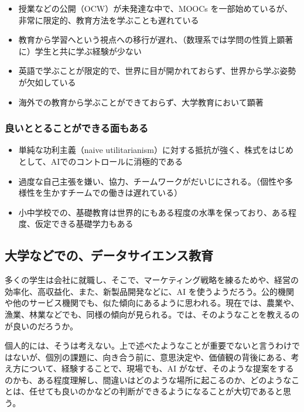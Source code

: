 \documentclass[
]{book}
\providecommand{\tightlist}{%
  \setlength{\itemsep}{0pt}\setlength{\parskip}{0pt}}
\theoremstyle{definition}
\theoremstyle{definition}
\theoremstyle{definition}
\theoremstyle{definition}
\theoremstyle{remark}
\begin{document}
\begin{itemize}
\tightlist
\item
  授業などの公開（OCW）が未発達な中で、MOOCs を一部始めているが、非常に限定的、教育方法を学ぶことも遅れている
\item
  教育から学習へという視点への移行が遅れ、（数理系では学問の性質上顕著に）学生と共に学ぶ経験が少ない
\item
  英語で学ぶことが限定的で、世界に目が開かれておらず、世界から学ぶ姿勢が欠如している
\item
  海外での教育から学ぶことができておらず、大学教育において顕著
\end{itemize}

\hypertarget{ux826fux3044ux3068ux3068ux308bux3053ux3068ux304cux3067ux304dux308bux9762ux3082ux3042ux308b}{%
\subsubsection{良いととることができる面もある}\label{ux826fux3044ux3068ux3068ux308bux3053ux3068ux304cux3067ux304dux308bux9762ux3082ux3042ux308b}}

\begin{itemize}
\tightlist
\item
  単純な功利主義（naive utilitarianism）に対する抵抗が強く、株式をはじめとして、AIでのコントロールに消極的である
\item
  過度な自己主張を嫌い、協力、チームワークがだいじにされる。（個性や多様性を生かすチームでの働きは遅れている）
\item
  小中学校での、基礎教育は世界的にもある程度の水準を保っており、ある程度、仮定できる基礎学力もある
\end{itemize}

\hypertarget{ux5927ux5b66ux306aux3069ux3067ux306eux30c7ux30fcux30bfux30b5ux30a4ux30a8ux30f3ux30b9ux6559ux80b2}{%
\subsection{大学などでの、データサイエンス教育}\label{ux5927ux5b66ux306aux3069ux3067ux306eux30c7ux30fcux30bfux30b5ux30a4ux30a8ux30f3ux30b9ux6559ux80b2}}

多くの学生は会社に就職し、そこで、マーケティング戦略を練るためや、経営の効率化、高収益化、また、新製品開発などに、AI を使うようだろう。公的機関や他のサービス機関でも、似た傾向にあるように思われる。現在では、農業や、漁業、林業などでも、同様の傾向が見られる。では、そのようなことを教えるのが良いのだろうか。

個人的には、そうは考えない。上で述べたようなことが重要でないと言うわけではないが、個別の課題に、向き合う前に、意思決定や、価値観の背後にある、考え方について、経験することで、現場でも、AI がなぜ、そのような提案をするのかも、ある程度理解し、間違いはどのような場所に起こるのか、どのようなことは、任せても良いのかなどの判断ができるようになることが大切であると思う。
\end{document}
